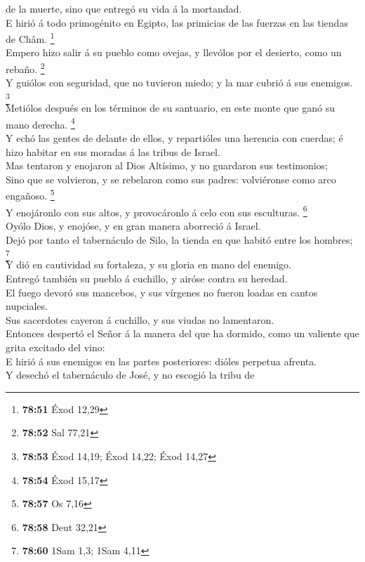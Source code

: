 de la muerte, sino que entregó su vida á la mortandad.\\
 E hirió á todo primogénito en Egipto, las primicias de las
fuerzas en las tiendas de Châm. \footnote{\textbf{78:51} Éxod 12,29}\\
 Empero hizo salir á su pueblo como ovejas, y llevólos por
el desierto, como un rebaño. \footnote{\textbf{78:52} Sal 77,21}\\
 Y guiólos con seguridad, que no tuvieron miedo; y la mar
cubrió á sus enemigos. \footnote{\textbf{78:53} Éxod 14,19; Éxod 14,22;
  Éxod 14,27}\\
 Metiólos después en los términos de su santuario, en este
monte que ganó su mano derecha. \footnote{\textbf{78:54} Éxod 15,17}\\
 Y echó las gentes de delante de ellos, y repartióles una
herencia con cuerdas; é hizo habitar en sus moradas á las tribus de
Israel.\\
 Mas tentaron y enojaron al Dios Altísimo, y no guardaron
sus testimonios;\\
 Sino que se volvieron, y se rebelaron como sus padres:
volviéronse como arco engañoso. \footnote{\textbf{78:57} Os 7,16}\\
 Y enojáronlo con sus altos, y provocáronlo á celo con sus
esculturas. \footnote{\textbf{78:58} Deut 32,21}\\
 Oyólo Dios, y enojóse, y en gran manera aborreció á
Israel.\\
 Dejó por tanto el tabernáculo de Silo, la tienda en que
habitó entre los hombres; \footnote{\textbf{78:60} 1Sam 1,3; 1Sam 4,11}\\
 Y dió en cautividad su fortaleza, y su gloria en mano del
enemigo.\\
 Entregó también su pueblo á cuchillo, y airóse contra su
heredad.\\
 El fuego devoró sus mancebos, y sus vírgenes no fueron
loadas en cantos nupciales.\\
 Sus sacerdotes cayeron á cuchillo, y sus viudas no
lamentaron.\\
 Entonces despertó el Señor á la manera del que ha dormido,
como un valiente que grita excitado del vino:\\
 E hirió á sus enemigos en las partes posteriores: dióles
perpetua afrenta.\\
 Y desechó el tabernáculo de José, y no escogió la tribu de
